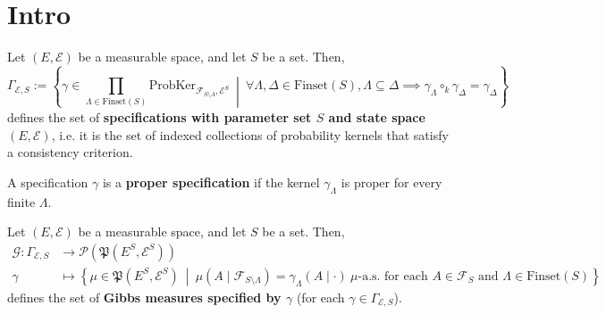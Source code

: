\chapter{Intro}

\begin{definition}[Specification]
    \label{def:specification}
    \leanok

    Let $(E, \mathcal{E})$ be a measurable space, and let $S$ be a set. Then,
    \begin{equation*}
        \Gamma_{\mathcal{E}, S}:=\left\{\gamma\in\prod_{\Lambda\in\text{Finset}(S)}\text{ProbKer}_{\mathcal{F}_{S\setminus\Lambda}, \mathcal{E}^S}~\middle\vert~ \forall \Lambda, \Delta\in\text{Finset}(S), \Lambda\subseteq\Delta\implies\gamma_\Lambda\circ_k\gamma_\Delta=\gamma_\Delta\right\}
    \end{equation*}
    defines the set of \textbf{specifications with parameter set $S$ and state space $(E, \mathcal{E})$}, i.e. it is the set of indexed collections of probability kernels that satisfy a consistency criterion.
\end{definition}

\begin{definition}
    \label{def:proper-specification}
    A specification $\gamma$ is a {\bf proper specification} if the kernel $\gamma_\Lambda$ is proper for every finite $\Lambda$.
\end{definition}

\begin{definition}
    \label{def:gibbs-measure}

    Let $(E, \mathcal{E})$ be a measurable space, and let $S$ be a set. Then,
    \begin{align*}
        \mathcal{G}:\Gamma_{\mathcal{E}, S}&\to\mathcal{P}(\mathfrak{P}(E^S, \mathcal{E}^S))\\
        \gamma&\mapsto\left\{\mu\in\mathfrak{P}(E^S, \mathcal{E}^S)~\middle\vert~\mu(A\mid\mathcal{F}_{S\setminus\Lambda})=\gamma_\Lambda(A\mid\cdot)~\mu\text{-a.s. for each } A\in\mathcal{F}_S\text{ and }\Lambda\in\text{Finset}(S)\right\}
    \end{align*}
    defines the set of \textbf{Gibbs measures specified by $\gamma$} (for each $\gamma\in\Gamma_{\mathcal{E}, S}$).
\end{definition}

